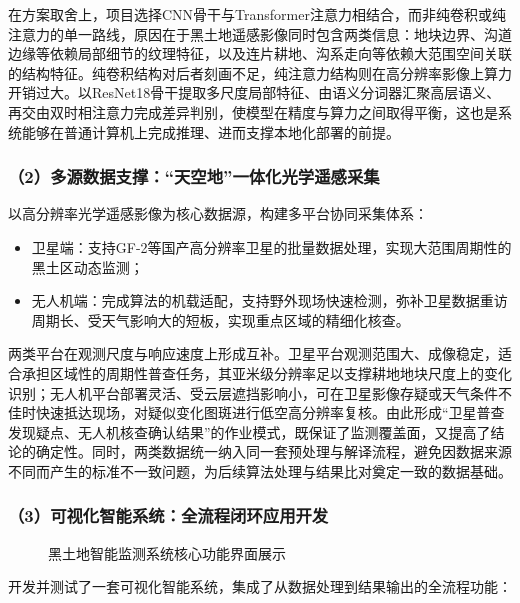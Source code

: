 在方案取舍上，项目选择CNN骨干与Transformer注意力相结合，而非纯卷积或纯注意力的单一路线，原因在于黑土地遥感影像同时包含两类信息：地块边界、沟道边缘等依赖局部细节的纹理特征，以及连片耕地、沟系走向等依赖大范围空间关联的结构特征。纯卷积结构对后者刻画不足，纯注意力结构则在高分辨率影像上算力开销过大。以ResNet18骨干提取多尺度局部特征、由语义分词器汇聚高层语义、再交由双时相注意力完成差异判别，使模型在精度与算力之间取得平衡，这也是系统能够在普通计算机上完成推理、进而支撑本地化部署的前提。

\subsubsection{（2）多源数据支撑：“天空地”一体化光学遥感采集}

以高分辨率光学遥感影像为核心数据源，构建多平台协同采集体系：

\begin{itemize}
    \item 卫星端：支持GF-2等国产高分辨率卫星的批量数据处理，实现大范围周期性的黑土区动态监测；
    \item 无人机端：完成算法的机载适配，支持野外现场快速检测，弥补卫星数据重访周期长、受天气影响大的短板，实现重点区域的精细化核查。
\end{itemize}

两类平台在观测尺度与响应速度上形成互补。卫星平台观测范围大、成像稳定，适合承担区域性的周期性普查任务，其亚米级分辨率足以支撑耕地地块尺度上的变化识别；无人机平台部署灵活、受云层遮挡影响小，可在卫星影像存疑或天气条件不佳时快速抵达现场，对疑似变化图斑进行低空高分辨率复核。由此形成“卫星普查发现疑点、无人机核查确认结果”的作业模式，既保证了监测覆盖面，又提高了结论的确定性。同时，两类数据统一纳入同一套预处理与解译流程，避免因数据来源不同而产生的标准不一致问题，为后续算法处理与结果比对奠定一致的数据基础。

\subsubsection{（3）可视化智能系统：全流程闭环应用开发}

\begin{figure}[htbp]
    \centering
    \caption{黑土地智能监测系统核心功能界面展示}
    \label{fig:1}
\end{figure}

开发并测试了一套可视化智能系统，集成了从数据处理到结果输出的全流程功能：

